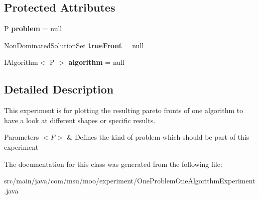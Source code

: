 \subsection*{Protected Attributes}
\begin{DoxyCompactItemize}
\item 
\hypertarget{classcom_1_1msu_1_1moo_1_1experiment_1_1OneProblemOneAlgorithmExperiment_3_01P_01extends_01IProblem_01_4_a5e7eb55ed2fbd594059caa0cfc2286b1}{P {\bfseries problem} = null}\label{classcom_1_1msu_1_1moo_1_1experiment_1_1OneProblemOneAlgorithmExperiment_3_01P_01extends_01IProblem_01_4_a5e7eb55ed2fbd594059caa0cfc2286b1}

\item 
\hypertarget{classcom_1_1msu_1_1moo_1_1experiment_1_1OneProblemOneAlgorithmExperiment_3_01P_01extends_01IProblem_01_4_aa6923a1cfc9aa1d0de6c6b6e5e5de402}{\hyperlink{classcom_1_1msu_1_1moo_1_1model_1_1solution_1_1NonDominatedSolutionSet}{Non\-Dominated\-Solution\-Set} {\bfseries true\-Front} = null}\label{classcom_1_1msu_1_1moo_1_1experiment_1_1OneProblemOneAlgorithmExperiment_3_01P_01extends_01IProblem_01_4_aa6923a1cfc9aa1d0de6c6b6e5e5de402}

\item 
\hypertarget{classcom_1_1msu_1_1moo_1_1experiment_1_1OneProblemOneAlgorithmExperiment_3_01P_01extends_01IProblem_01_4_abab19d6f1451cb1eafd18460293c5d56}{I\-Algorithm$<$ P $>$ {\bfseries algorithm} = null}\label{classcom_1_1msu_1_1moo_1_1experiment_1_1OneProblemOneAlgorithmExperiment_3_01P_01extends_01IProblem_01_4_abab19d6f1451cb1eafd18460293c5d56}

\end{DoxyCompactItemize}


\subsection{Detailed Description}
This experiment is for plotting the resulting pareto fronts of one algorithm to have a look at different shapes or specific results.


\begin{DoxyParams}{Parameters}
{\em $<$\-P$>$} & Defines the kind of problem which should be part of this experiment \\
\hline
\end{DoxyParams}


The documentation for this class was generated from the following file\-:\begin{DoxyCompactItemize}
\item 
src/main/java/com/msu/moo/experiment/One\-Problem\-One\-Algorithm\-Experiment.\-java\end{DoxyCompactItemize}
